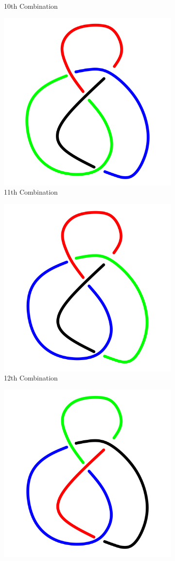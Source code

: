 \documentclass[a4paper,9pt]{article}
\begin{document}
\begin{enumerate}
\begin{figure}[h!]
\begin{subfigure}[b]{0.25\linewidth}
	\caption{10th Combination}
\end{subfigure}
\qquad
\begin{subfigure}[b]{0.25\linewidth}
	\centering
	\includegraphics[width=0.5\linewidth]{picture/knotpict/knot-11}
	\caption{11th Combination}
\end{subfigure}
\qquad
\begin{subfigure}[b]{0.25\linewidth}
	\centering
	\includegraphics[width=0.5\linewidth]{picture/knotpict/knot-12}
	\caption{12th Combination}
\end{subfigure}
\qquad
\begin{subfigure}[b]{0.25\linewidth}
	\centering
	\includegraphics[width=0.5\linewidth]{picture/knotpict/knot-13}

\end{subfigure}
\end{figure}
\end{enumerate}
\end{document}
